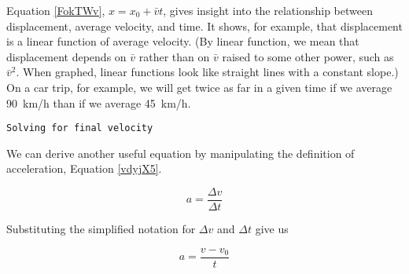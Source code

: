 \documentclass[main-ap-physics.tex]{subfiles}
\begin{document}
\endsolution

Equation \eqref{FokTWv}, $x = x_0 + \bar{v} t$, gives insight into the relationship between displacement, average velocity, and time. It shows, for example, that displacement is a linear function of average velocity. (By linear function, we mean that displacement depends on $\bar{v}$ rather than on $\bar{v}$ raised to some other power, such as $\bar{v}^2$. When graphed, linear functions look like straight lines with a constant slope.) On a car trip, for example, we will get twice as far in a given time if we average \SI{90}{km/h} than if we average \SI{45}{km/h}.


\begin{center}
\captionsetup{type=figure,margin=1in,font=scriptsize}
\end{center}

\cyanhrule

\begin{center}
   \texttt{Solving for final velocity} 
\end{center}

We can derive another useful equation by manipulating the definition of acceleration, Equation \eqref{vdyjX5}.

\begin{equation*}
    a = \frac{\Delta v}{\Delta t}
\end{equation*}

Substituting the simplified notation for $\Delta v$ and $\Delta t$ give us

\begin{equation*}
    a = \frac{v - v_0}{t}
\end{equation*}
\end{document}
